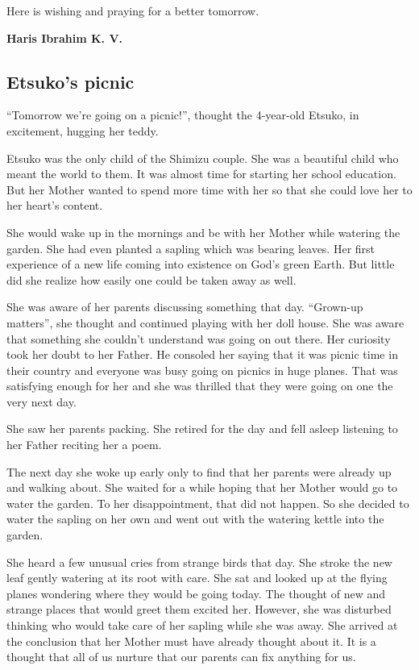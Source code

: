 \documentclass[twoside,11pt,titlepage]{article}
\begin{document}
Here is wishing and praying for a better tomorrow.

\textbf{Haris Ibrahim K. V.}


\newpage
\begin{center}
  \section{Etsuko's picnic}
\end{center}
\bigskip
\bigskip
\bigskip
``Tomorrow we're going on a picnic!'', thought the 4-year-old Etsuko, in excitement, hugging her teddy.

Etsuko was the only child of the Shimizu couple. She was a beautiful child who meant the world to them. It was almost time for starting her school education. But her Mother wanted to spend more time with her so that she could love her to her heart's content.

She would wake up in the mornings and be with her Mother while watering the garden. She had even planted a sapling which was bearing leaves. Her first experience of a new life coming into existence on God's green Earth. But little did she realize how easily one could be taken away as well.

She was aware of her parents discussing something that day. ``Grown-up matters'', she thought and continued playing with her doll house. She was aware that something she couldn't understand was going on out there. Her curiosity took her doubt to her Father. He consoled her saying that it was picnic time in their country and everyone was busy going on picnics in huge planes. That was satisfying enough for her and she was thrilled that they were going on one the very next day.

She saw her parents packing. She retired for the day and fell asleep listening to her Father reciting her a poem.

The next day she woke up early only to find that her parents were already up and walking about. She waited for a while hoping that her Mother would go to water the garden. To her disappointment, that did not happen. So she decided to water the sapling on her own and went out with the watering kettle into the garden.

She heard a few unusual cries from strange birds that day. She stroke the new leaf gently watering at its root with care. She sat and looked up at the flying planes wondering where they would be going today. The thought of new and strange places that would greet them excited her. However, she was disturbed thinking who would take care of her sapling while she was away. She arrived at the conclusion that her Mother must have already thought about it. It is a thought that all of us nurture that our parents can fix anything for us.
\end{document}
